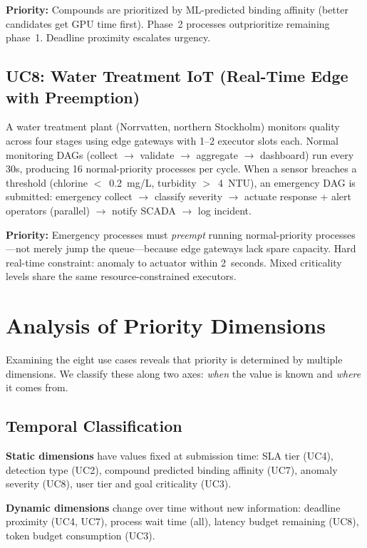\documentclass[conference]{IEEEtran}
\begin{document}
\textbf{Priority:} Compounds are prioritized by ML-predicted binding affinity (better candidates get GPU time first). Phase~2 processes outprioritize remaining phase~1. Deadline proximity escalates urgency.

\subsection{UC8: Water Treatment IoT (Real-Time Edge with Preemption)}
\label{sec:uc8}

A water treatment plant (Norrvatten, northern Stockholm) monitors quality across four stages using edge gateways with 1--2 executor slots each. Normal monitoring DAGs (collect $\rightarrow$ validate $\rightarrow$ aggregate $\rightarrow$ dashboard) run every 30s, producing 16 normal-priority processes per cycle. When a sensor breaches a threshold (chlorine $<$~0.2~mg/L, turbidity $>$~4~NTU), an emergency DAG is submitted: emergency collect $\rightarrow$ classify severity $\rightarrow$ actuate response + alert operators (parallel) $\rightarrow$ notify SCADA $\rightarrow$ log incident.

\textbf{Priority:} Emergency processes must \emph{preempt} running normal-priority processes---not merely jump the queue---because edge gateways lack spare capacity. Hard real-time constraint: anomaly to actuator within 2~seconds. Mixed criticality levels share the same resource-constrained executors.

\section{Analysis of Priority Dimensions}
\label{sec:analysis}

Examining the eight use cases reveals that priority is determined by multiple dimensions. We classify these along two axes: \emph{when} the value is known and \emph{where} it comes from.

\subsection{Temporal Classification}

\textbf{Static dimensions} have values fixed at submission time: SLA tier (UC4), detection type (UC2), compound predicted binding affinity (UC7), anomaly severity (UC8), user tier and goal criticality (UC3).

\textbf{Dynamic dimensions} change over time without new information: deadline proximity (UC4, UC7), process wait time (all), latency budget remaining (UC8), token budget consumption (UC3).
\end{document}
